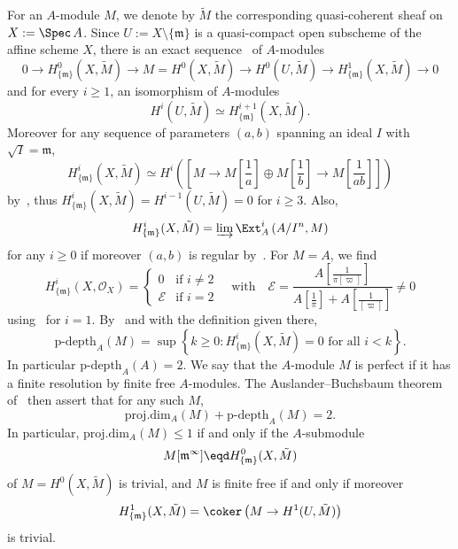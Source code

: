 For an $A$-module $M$, we denote by $\tilde{M}$ the corresponding quasi-coherent sheaf on $X:=\Spec\,A$. Since $U:=X\setminus\{\mathfrak{m}\}$ is a quasi-compact open subscheme of the affine scheme $X$, there is an exact sequence~\cite[II Corollaire~4]{SGA2r} of $A$-modules
\[
0\rightarrow H_{\{\mathfrak{m}\}}^{0}(X,\tilde{M})\rightarrow M=H^{0}(X,\tilde{M})\rightarrow H^{0}(U,\tilde{M})\rightarrow H_{\{\mathfrak{m}\}}^{1}(X,\tilde{M})\rightarrow0
\]
and for every $i\geq1$, an isomorphism of $A$-modules
\[
H^{i}(U,\tilde{M})\simeq H_{\{\mathfrak{m}\}}^{i+1}(X,\tilde{M}).
\]
Moreover for any sequence of parameters $(a,b)$ spanning an ideal $I$ with $\sqrt{I}=\mathfrak{m}$,
\[
H_{\{\mathfrak{m}\}}^{i}(X,\tilde{M})\simeq H^{i}\left(\left[M\rightarrow M\left[{\frac{1}{a}}\right]\oplus M\left[{\frac{1}{b}}\right]\rightarrow M\left[{\frac{1}{ab}}\right]\right]\right)
\]
by~\cite[II Proposition~5]{SGA2r}, thus $H_{\{\mathfrak{m}\}}^{i}(X,\tilde{M})=H^{i-1}(U,\tilde{M})=0$ for $i\geq3$. Also,
\[
H_{\{\mathfrak{m}\}}^{i}(X,\tilde{M})=\underrightarrow{\lim}\,\Ext_{A}^{i}\left(A/I^{n},M\right)
\]
for any $i\geq0$ if moreover $(a,b)$ is regular by~\cite[II Lemme~9]{SGA2r}. For $M=A$, we find
\[
H_{\{\mathfrak{m}\}}^{i}\left(X,\mathcal{O}_{X}\right)=
\begin{cases}
0 & \text{if }i\neq2\\
\mathcal{E} & \text{if }i=2
\end{cases}\quad\text{with}\quad\mathcal{E}=\frac{A\left[{\frac{1}{\pi[\varpi]}}\right]}{A\left[{\frac{1}{\pi}}\right]+A\left[{\frac{1}{[\varpi]}}\right]}\neq0
\]
using~\cite[4.6]{BaMoSc16} for $i=1$. By~\cite[2.6 \& 2.7]{HaMa07} and with the definition given there,
\[
\text{p-depth}_{A}(M)=\sup\left\{ k\geq0:H_{\{\mathfrak{m}\}}^{i}\left(X,\tilde{M}\right)=0\text{ for all }i<k\right\}.
\]
In particular $\text{p-depth}_{A}(A)=2$. We say that the $A$-module $M$ is perfect if it has a finite resolution by finite free $A$-modules. The Auslander--Buchsbaum theorem of~\cite[Chapter~6, Theorem~2]{No76} then assert that for any such $M$,
\[
\text{proj}.\text{dim}_{A}(M)+\text{p-depth}_{A}(M)=2.
\]
In particular, $\text{proj}.\text{dim}_{A}(M)\leq1$ if and only if the $A$-submodule
\[
M[\mathfrak{m}^{\infty}]\eqd H_{\{\mathfrak{m}\}}^{0}(X,\tilde{M})
\]
of $M=H^{0}(X,\tilde{M})$ is trivial, and $M$ is finite free if and only if moreover
\[
H_{\{\mathfrak{m}\}}^{1}(X,\tilde{M})=\coker\left(M\rightarrow H^{1}(U,\tilde{M})\right)
\]
is trivial.

\subsubsection{}\label{subsec:basicsonModA*}

